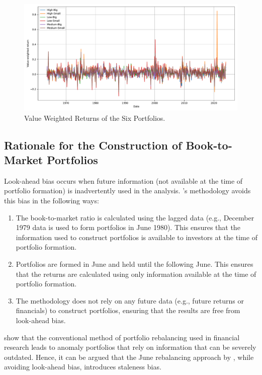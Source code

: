 \documentclass[a4paper,10pt,american]{article}
\begin{document}
\begin{figure}[H]
\centering
\includegraphics[width=1\linewidth]{../Plots/vw_returns_six_portfolios.pdf}
\caption{Value Weighted Returns of the Six Portfolios.}
\label{fig:VWSP}
\end{figure}

\subsection*{Rationale for the Construction of Book-to-Market Portfolios}

Look-ahead bias occurs when future information (not available at the time
 of portfolio formation) is inadvertently used in the analysis. 
 \cite{fama1992cross}'s methodology avoids this bias in the following ways:
\begin{enumerate}
    \item The book-to-market ratio is calculated using the lagged data 
    (e.g., December 1979 data is used to form portfolios in June 1980).
    This ensures that the information used to construct portfolios is
    available to investors at the time of portfolio formation.
    \item Portfolios are formed in June and held until the following June. 
    This ensures that the returns are calculated using only information
    available at the time of portfolio formation.
    \item The methodology does not rely on any future data (e.g., 
    future returns or financials) to construct portfolios, ensuring 
    that the results are free from look-ahead bias.
\end{enumerate}

\cite{bowles2024anomaly} show that the conventional method of portfolio rebalancing
used in ﬁnancial research leads to anomaly portfolios that rely on information that
can be severely outdated. Hence, it can be argued that the June rebalancing approach by 
\cite{fama1992cross}, while avoiding look-ahead bias, introduces staleness bias.
\end{document}
